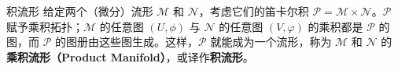 \begin{definition}{积流形}
给定两个（微分）流形 $\mathcal{M}$ 和 $\mathcal{N}$，考虑它们的笛卡尔积 $\mathcal{P}=\mathcal{M}\times\mathcal{N}$。$\mathcal{P}$ 赋予乘积拓扑；$\mathcal{M}$ 的任意图 $(U, \phi)$ 与 $\mathcal{N}$ 的任意图 $(V, \varphi)$ 的乘积都是 $\mathcal{P}$ 的图，而 $\mathcal{P}$ 的图册由这些图生成。这样，$\mathcal{P}$ 就能成为一个流形，称为 $\mathcal{M}$ 和 $\mathcal{N}$ 的\textbf{乘积流形（Product Manifold）}，或译作\textbf{积流形}。
\end{definition}
